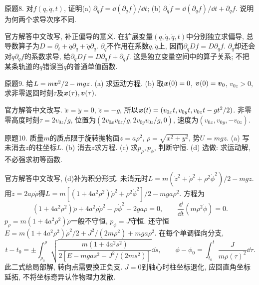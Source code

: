 \begin{exercise}
原题8. 对$f(q,\dot q,t)$, 证明(a) $\partial_q\dot f=\dd(\partial_qf)/\dd t$; (b) $\partial_{\dot q}\dot f=\dd(\partial_{\dot q}f)/\dd t+\partial_qf$. 说明为何两个求导次序不同.
\end{exercise}
\begin{solution}
官方解答中文改写, 补正偏导的意义. 在扩展变量$(q,\dot q,\ddot q,t)$中分别独立求偏导, 总导数算子为$D=\partial_t+\dot q\partial_q+\ddot q\partial_{\dot q}$. $\partial_q$不作用在系数$\dot q,\ddot q$上, 因而$\partial_qDf=D\partial_qf$. $\partial_{\dot q}$却还会对$\dot q\partial_qf$的系数求导, 给$\partial_{\dot q}Df=D\partial_{\dot q}f+\partial_qf$. 这是独立变量空间中的算子关系; 不把某条轨道的$\dot q$错误当$q$的普通单值函数.
\end{solution}

\begin{exercise}
原题9. 给$L=m\boldsymbol{v}^2/2-mgz$. (a) 求运动方程. (b) 取$\boldsymbol{x}(0)=0$, $\boldsymbol{v}(0)=\boldsymbol{v}_0$, $v_{0z}>0$, 求非零返回时刻$\tau$及$\boldsymbol{x}(\tau),\boldsymbol{v}(\tau)$.
\end{exercise}
\begin{solution}
官方解答中文改写. $\ddot x=\ddot y=0$, $\ddot z=-g$, 所以$\boldsymbol{x}(t)=(v_{0x}t,v_{0y}t,v_{0z}t-gt^2/2)$. 非零零高度时刻$\tau=2v_{0z}/g$, 位置为$(2v_{0x}v_{0z}/g,2v_{0y}v_{0z}/g,0)$, 速度为$(v_{0x},v_{0y},-v_{0z})$.
\end{solution}

\begin{exercise}
原题10. 质量$m$的质点限于旋转抛物面$z=a\rho^2$, $\rho=\sqrt{x^2+y^2}$, 势$U=mgz$. (a) 写未消去$z$的柱坐标$L$. (b) 消去$z$求方程. (c) 求$p_\rho,p_\phi$, 判断守恒. (d) 选做: 求运动解, 不必强求初等函数.
\end{exercise}
\begin{solution}
官方解答中文改写, (d)补为积分形式. 未消元时$L=m(\dot z^2+\dot\rho^2+\rho^2\dot\phi^2)/2-mgz$. 用$\dot z=2a\rho\dot\rho$得$L=m[(1+4a^2\rho^2)\dot\rho^2+\rho^2\dot\phi^2]/2-mga\rho^2$. 方程为
\[
(1+4a^2\rho^2)\ddot\rho+4a^2\rho\dot\rho^2-\rho\dot\phi^2+2ga\rho=0,
\qquad \frac{\dd}{\dd t}(m\rho^2\dot\phi)=0.
\]
$p_\rho=m(1+4a^2\rho^2)\dot\rho$一般不守恒, $p_\phi=J$守恒. 还守恒$E=m(1+4a^2\rho^2)\dot\rho^2/2+J^2/(2m\rho^2)+mga\rho^2$. 在每个单调径向分支,
\[
t-t_0=\pm\int_{\rho_0}^{\rho}\sqrt{\frac{m(1+4a^2s^2)}{2[E-mgas^2-J^2/(2ms^2)]}}\dd s,
\qquad \phi-\phi_0=\int_{t_0}^t\frac{J}{m\rho(\tau)^2}\dd\tau.
\]
此二式给局部解, 转向点需要换正负支. $J=0$到轴心时柱坐标退化, 应回直角坐标延拓, 不将坐标奇异认作物理力发散.
\end{solution}
